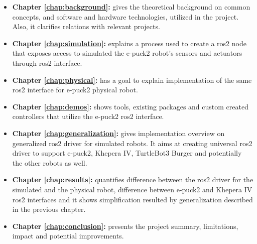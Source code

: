 \begin{itemize}
    \item \textbf{Chapter \ref{chap:background}: } gives the theoretical background on common concepts, and software and hardware technologies, utilized in the project.
    Also, it clarifies relations with relevant projects.
    
    \item \textbf{Chapter \ref{chap:simulation}: } explains a process used to create a \ac{ros2} node that exposes access to simulated the e-puck2 robot's sensors and actuators through \ac{ros2} interface.
    
    \item \textbf{Chapter \ref{chap:physical}: } has a goal to explain implementation of the same \ac{ros2} interface for e-puck2 physical robot.
    
    \item \textbf{Chapter \ref{chap:demos}: } shows tools, existing packages and custom created controllers that utilize the e-puck2 \ac{ros2} interface.
    
    \item \textbf{Chapter \ref{chap:generalization}: } gives implementation overview on generalized \ac{ros2} driver for simulated robots.
    It aims at creating universal \ac{ros2} driver to support e-puck2, Khepera IV, TurtleBot3 Burger and potentially the other robots as well.
    
    \item \textbf{Chapter \ref{chap:results}: } quantifies difference between the \ac{ros2} driver for the simulated and the physical robot, difference between e-puck2 and Khepera IV \ac{ros2} interfaces and it shows simplification resulted by generalization described in the previous chapter.
    
    \item \textbf{Chapter \ref{chap:conclusion}: } presents the project summary, limitations, impact and potential improvements.
\end{itemize}